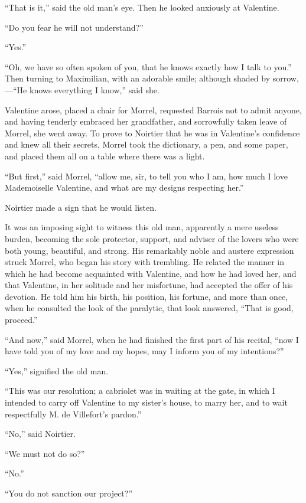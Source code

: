 “That is it,” said the old man’s eye. Then he looked anxiously at
Valentine.

“Do you fear he will not understand?”

“Yes.”

“Oh, we have so often spoken of you, that he knows exactly how I talk
to you.” Then turning to Maximilian, with an adorable smile; although
shaded by sorrow,—“He knows everything I know,” said she.

Valentine arose, placed a chair for Morrel, requested Barrois not to
admit anyone, and having tenderly embraced her grandfather, and
sorrowfully taken leave of Morrel, she went away. To prove to Noirtier
that he was in Valentine’s confidence and knew all their secrets,
Morrel took the dictionary, a pen, and some paper, and placed them all
on a table where there was a light.

“But first,” said Morrel, “allow me, sir, to tell you who I am, how
much I love Mademoiselle Valentine, and what are my designs respecting
her.”

Noirtier made a sign that he would listen.

It was an imposing sight to witness this old man, apparently a mere
useless burden, becoming the sole protector, support, and adviser of
the lovers who were both young, beautiful, and strong. His remarkably
noble and austere expression struck Morrel, who began his story with
trembling. He related the manner in which he had become acquainted with
Valentine, and how he had loved her, and that Valentine, in her
solitude and her misfortune, had accepted the offer of his devotion. He
told him his birth, his position, his fortune, and more than once, when
he consulted the look of the paralytic, that look answered, “That is
good, proceed.”

“And now,” said Morrel, when he had finished the first part of his
recital, “now I have told you of my love and my hopes, may I inform you
of my intentions?”

“Yes,” signified the old man.

“This was our resolution; a cabriolet was in waiting at the gate, in
which I intended to carry off Valentine to my sister’s house, to marry
her, and to wait respectfully M. de Villefort’s pardon.”

“No,” said Noirtier.

“We must not do so?”

“No.”

“You do not sanction our project?”

